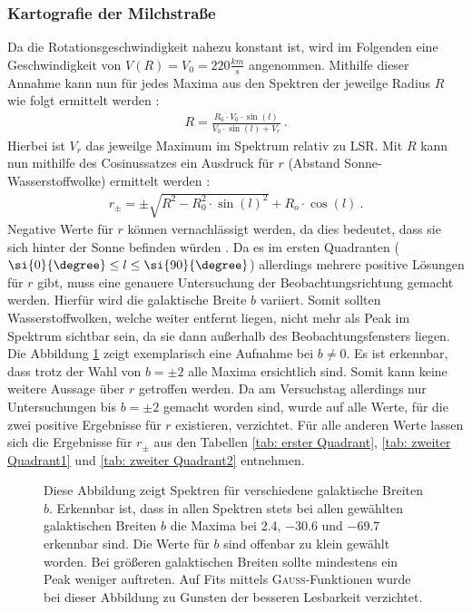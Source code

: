\subsubsection{Kartografie der Milchstraße}
Da die Rotationsgeschwindigkeit nahezu konstant ist, wird im Folgenden eine Geschwindigkeit von $V(R) = V_0 = \si{220}{\frac{km}{s}}$ angenommen. Mithilfe dieser Annahme kann nun für jedes Maxima aus den Spektren der jeweilge Radius $R$ wie folgt ermittelt werden \cite{H1}:
\begin{align}
    R =\frac{R_0 \cdot V_0 \cdot \sin(l)}{V_0 \cdot \sin(l) + V_r} \ .
    \label{eq:BerechnungR}
\end{align}
Hierbei ist $V_r$ das jeweilge Maximum im Spektrum relativ zu LSR.\newline
Mit $R$ kann nun mithilfe des Cosinussatzes ein Ausdruck für $r$ (Abstand Sonne-Wasserstoffwolke) ermittelt werden \cite{H1}:
\begin{align}
    r_{\pm} = \pm \sqrt{R^2 - R_0^2 \cdot \sin(l)^2} + R_o \cdot \cos(l) \ .
    \label{eq:Berechnungr}
\end{align}
Negative Werte für $r$ können vernachlässigt werden, da dies bedeutet, dass sie sich hinter der Sonne befinden würden \cite{H1}. Da es im ersten Quadranten ($ \si{0}{\degree} \le l \le \si{90}{\degree}$) allerdings mehrere positive Lösungen für $r$ gibt, muss eine genauere Untersuchung der Beobachtungsrichtung gemacht werden. 
Hierfür wird die galaktische Breite $b$ variiert. Somit sollten Wasserstoffwolken, welche weiter entfernt liegen, nicht mehr als Peak im Spektrum sichtbar sein, da sie dann außerhalb des Beobachtungsfensters liegen. Die Abbildung \ref{fig:bungleichnull} zeigt exemplarisch eine Aufnahme bei $b \neq 0$. Es ist erkennbar, dass trotz der Wahl von $b = \pm 2$ alle Maxima ersichtlich sind. Somit kann keine weitere Aussage über $r$ getroffen werden. Da am Versuchstag allerdings nur Untersuchungen bis $b = \pm 2$ gemacht worden sind, wurde auf alle Werte, für die zwei positive Ergebnisse für $r$ existieren, verzichtet. Für alle anderen Werte lassen sich die Ergebnisse für $r_{\pm}$ aus den Tabellen \ref{tab: erster Quadrant}, \ref{tab: zweiter Quadrant1} und \ref{tab: zweiter Quadrant2} entnehmen.
\begin{figure}[H]
    \centering
       
    \caption[Spektren für verschiedene galaktische Breiten $b$]{Diese Abbildung zeigt Spektren für verschiedene galaktische Breiten $b$. Erkennbar ist, dass in allen Spektren stets bei allen gewählten galaktischen Breiten $b$ die Maxima bei \SI{2.4}{}, \SI{-30.6}{} und \SI{-69.7}{} erkennbar sind. Die Werte für $b$ sind offenbar zu klein gewählt worden. Bei größeren galaktischen Breiten sollte mindestens ein Peak weniger auftreten. Auf Fits mittels \textsc{Gauß}-Funktionen wurde bei dieser Abbildung zu Gunsten der besseren Lesbarkeit verzichtet.}
    \label{fig:bungleichnull}
\end{figure}
